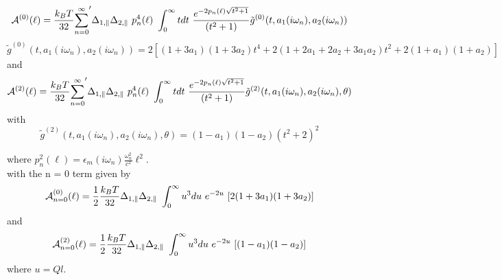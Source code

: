 \documentclass[a4paper]{article}
\begin{document}
\begin{center}
\begin{equation}
{\cal A}^{(0)}(\ell) = \frac{k_BT}{32}  {\sum_{n=0}^{\infty}}' \Delta_{1,\parallel} \Delta_{2,\parallel} ~p_n^{4}(\ell) ~\int_0^{\infty} t dt ~\frac{e^{- 2 p_n(\ell) \sqrt{t^{2} + 1}}}{(t^{2} + 1)} \tilde g^{(0)}(t, a_1(i \omega_n), a_2(i \omega_n))
\end{equation}
\begin{equation}
\tilde g^{(0)}(t, a_1(i \omega_n), a_2(i \omega_n)) = 2 \left[ (1+3a_1)(1+3a_2) t^{4} + 2 (1+2a_1+2a_2+3a_1a_2) t^{2}  + 2(1+a_1)(1+a_2)\right]
\end{equation}
and
\begin{equation}
{\cal A}^{(2)}(\ell) = \frac{k_BT}{32}  {\sum_{n=0}^{\infty}}' \Delta_{1,\parallel} \Delta_{2,\parallel} ~p_n^{4}(\ell) ~\int_0^{\infty} t dt ~\frac{e^{- 2 p_n(\ell) \sqrt{t^{2} + 1}}}{(t^{2} + 1)} \tilde g^{(2)}(t, a_1(i \omega_n), a_2(i \omega_n), \theta)
\end{equation}
with
\begin{equation}
\tilde g^{(2)}(t, a_1(i \omega_n), a_2(i \omega_n), \theta) = (1-a_1)(1-a_2)(t^{2} + 2)^2
\label{befgqw}
\end{equation}

where $p_n^{2}(\ell) =  \epsilon_m(i \omega_n) \frac{\omega_n^{2}}{c^{2}}
\ell^{2}$. \\

with the n = 0 term given by
\begin{equation}
    {\cal A}_{n=0}^{(0)}(\ell) = \frac{1}{2} \frac{k_BT}{32}
    \Delta_{1,\parallel} \Delta_{2,\parallel} ~\int_0^{\infty} u^3 du\,\,
    e^{-2u}\,\,[2(1 + 3a_1)(1 + 3a_2) ]
\end{equation}
and
\begin{equation}
    {\cal A}_{n=0}^{(2)}(\ell) = \frac{1}{2} \frac{k_BT}{32}
    \Delta_{1,\parallel} \Delta_{2,\parallel} ~\int_0^{\infty} u^3 du\,\,
    e^{-2u}\,\,[(1 - a_1)(1 - a_2) ]
\end{equation}
where $u = Ql$.



\hskip 73pt


\end{center}
\end{document}

